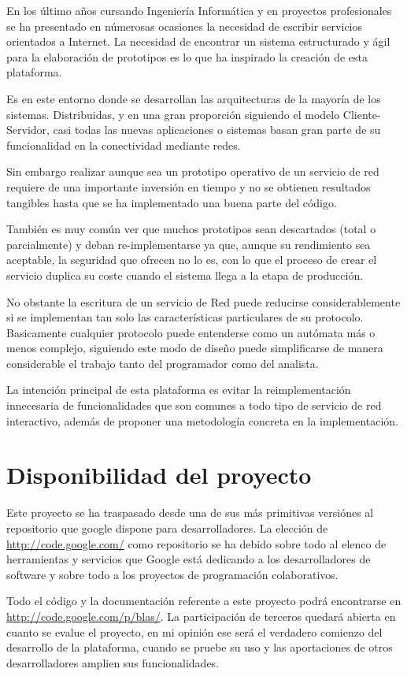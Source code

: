 \documentclass[a4paper,spanish,12pt]{book}
\begin{document}
En los último años cursando Ingeniería Informática y en proyectos profesionales se ha presentado en númerosas ocasiones la necesidad de escribir servicios orientados a Internet. La necesidad de encontrar un sistema estructurado y ágil para la elaboración de prototipos es lo que ha inspirado la creación de esta plataforma.

Es en este entorno donde se desarrollan las arquitecturas de la mayor\'ia de los sistemas. Distribuidas, y en una gran proporci\'on siguiendo el modelo Cliente-Servidor, casi todas las nuevas aplicaciones o sistemas basan gran parte de su funcionalidad en la conectividad mediante redes. 

Sin embargo realizar aunque sea un prototipo operativo de un servicio de red requiere de una importante inversión en tiempo y no se obtienen resultados tangibles hasta que se ha implementado una buena parte del código.

Tambi\'en es muy com\'un ver que muchos prototipos sean descartados (total o parcialmente) y deban re-implementarse ya que, aunque su rendimiento sea aceptable, la seguridad que ofrecen no lo es, con lo que el proceso de crear el servicio duplica su coste cuando el sistema llega a la etapa de producci\'on.

No obstante la escritura de un servicio de Red puede reducirse considerablemente si se implementan tan solo las características particulares de su protocolo. Basicamente cualquier protocolo puede entenderse como un autómata m\'as o menos complejo, siguiendo este modo de diseño puede simplificarse de manera considerable el trabajo tanto del programador como del analista.

La intención principal de esta plataforma es evitar la reimplementación innecesaria de funcionalidades que son comunes a todo tipo de servicio de red interactivo, además de proponer una metodología concreta en la implementación.
\section{Disponibilidad del proyecto}
Este proyecto se ha traspasado desde una de sus más primitivas versiónes al repositorio que google dispone para desarrolladores. La elección de \url{http://code.google.com/} como repositorio se ha debido sobre todo al elenco de herramientas y servicios que Google está dedicando a los desarrolladores de software y sobre todo a los proyectos de programación colaborativos.

Todo el código y la documentación referente a este proyecto podrá encontrarse en \url{http://code.google.com/p/blas/}. La participación de terceros quedará abierta en cuanto se evalue el proyecto, en mi opinión ese será el verdadero comienzo del desarrollo de la plataforma, cuando se pruebe su uso y las aportaciones de otros desarrolladores amplien sus funcionalidades.
\end{document}
